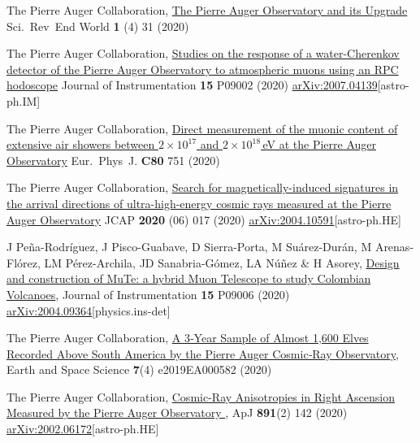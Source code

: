 \begin{etaremune}
\item {}The Pierre Auger Collaboration, \href{https://doi.org/10.52712/sciencereviews.v1i4.31}{The Pierre Auger Observatory and its Upgrade} Sci.\ Rev\  End World {\textbf{1}} (4) 31 (2020)

\item {}The Pierre Auger Collaboration, \href{https://doi.org/10.1088/1748-0221/15/09/P09002}{Studies on the response of a water-Cherenkov detector of the Pierre Auger Observatory to atmospheric muons using an RPC hodoscope} Journal of Instrumentation {\textbf{15}} P09002 (2020) \href{https://arxiv.org/abs/2007.04139}{arXiv:2007.04139}[astro-ph.IM]

\item {}The Pierre Auger Collaboration, \href{https://doi.org/10.1140/epjc/s10052-020-8055-y}{Direct measurement of the muonic content of extensive air showers between $2\times 10^{17}$ and $2\times 10^{18}$\,eV at the Pierre Auger Observatory} Eur.\ Phys\  J. {\textbf{C80}} 751 (2020)


\item {}The Pierre Auger Collaboration, \href{https://doi.org/10.1088/1475-7516/2020/06/017}{Search for magnetically-induced signatures in the arrival directions of ultra-high-energy cosmic rays measured at the Pierre Auger Observatory} JCAP {\textbf{2020}} (06) 017 (2020) \href{https://arxiv.org/abs/2004.10591}{arXiv:2004.10591}[astro-ph.HE]

\item {} J Peña-Rodríguez, J Pisco-Guabave, D Sierra-Porta, M Suárez-Durán, M Arenas-Flórez, LM Pérez-Archila, JD Sanabria-Gómez, LA Núñez \& H Asorey, \href{https://doi.org/10.1088/1748-0221/15/09/P09006}{{Design and construction of MuTe: a hybrid Muon Telescope to study Colombian Volcanoes}}, Journal of Instrumentation {\textbf{15}} P09006 (2020) \href{https://arxiv.org/abs/2004.09364}{arXiv:2004.09364}[physics.ins-det]

\item {}The Pierre Auger Collaboration, \href{https://doi.org/10.1029/2019EA000582}{A 3‐Year Sample of Almost 1,600 Elves Recorded Above South America by the Pierre Auger Cosmic‐Ray Observatory}, Earth and Space Science {\textbf{7}}(4) e2019EA000582 (2020) %

\item {}The Pierre Auger Collaboration, \href{https://doi.org/10.3847/1538-4357/ab7236}{{Cosmic-Ray Anisotropies in Right Ascension Measured by the Pierre Auger Observatory
}}, ApJ {\textbf{891}}(2) 142 (2020) \href{https://arxiv.org/abs/2002.06172}{arXiv:2002.06172}[astro-ph.HE]


\end{etaremune}
